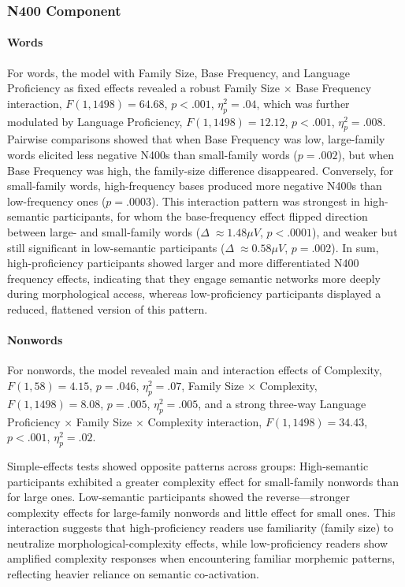 \subsubsection{N400 Component}

\paragraph{Words}

For words, the model with Family Size, Base Frequency, and Language Proficiency as fixed effects revealed a robust Family Size × Base Frequency interaction, $F(1, 1498) = 64.68$, $p < .001$, $\eta_p^2 = .04$, which was further modulated by Language Proficiency, $F(1, 1498) = 12.12$, $p < .001$, $\eta_p^2 = .008$.
Pairwise comparisons showed that when Base Frequency was low, large-family words elicited less negative N400s than small-family words ($p = .002$), but when Base Frequency was high, the family-size difference disappeared. Conversely, for small-family words, high-frequency bases produced more negative N400s than low-frequency ones ($p = .0003$). This interaction pattern was strongest in high-semantic participants, for whom the base-frequency effect flipped direction between large- and small-family words ($\Delta \; \approx 1.48 \mu V$, $p < .0001$), and weaker but still significant in low-semantic participants ($\Delta \; \approx 0.58 \mu V$, $p = .002$). In sum, high-proficiency participants showed larger and more differentiated N400 frequency effects, indicating that they engage semantic networks more deeply during morphological access, whereas low-proficiency participants displayed a reduced, flattened version of this pattern.

\paragraph{Nonwords}

For nonwords, the model revealed main and interaction effects of Complexity, $F(1, 58) = 4.15$, $p = .046$, $\eta_p^2 = .07$, Family Size × Complexity, $F(1, 1498) = 8.08$, $p = .005$, $\eta_p^2 = .005$, and a strong three-way Language Proficiency × Family Size × Complexity interaction, $F(1, 1498) = 34.43$, $p < .001$, $\eta_p^2 = .02$.

Simple-effects tests showed opposite patterns across groups:
High-semantic participants exhibited a greater complexity effect for small-family nonwords than for large ones.
Low-semantic participants showed the reverse—stronger complexity effects for large-family nonwords and little effect for small ones.
This interaction suggests that high-proficiency readers use familiarity (family size) to neutralize morphological-complexity effects, while low-proficiency readers show amplified complexity responses when encountering familiar morphemic patterns, reflecting heavier reliance on semantic co-activation.

